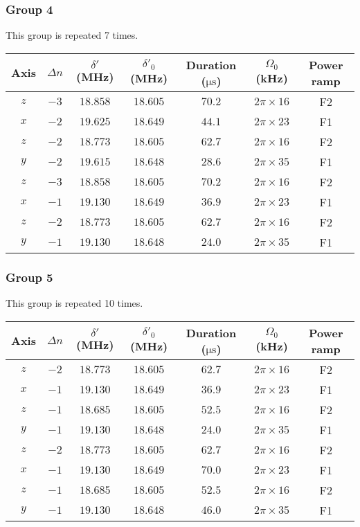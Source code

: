 \newpage
\subsubsection{Group 4}
This group is repeated 7 times.
\begin{center}
  \begin{tabular}{|c|c|c|c|c|c|c|}
    \hline
    Axis&$\Delta n$&$\delta'$ (MHz)&$\delta'_0$ (MHz)&Duration ($\mathrm{\mu s}$)& $\Omega_0$ (kHz)&Power ramp\\\hline
    $z$&$-3$&$18.858$&$18.605$&$70.2$&$2\pi\times16$&F2\\\hline
    $x$&$-2$&$19.625$&$18.649$&$44.1$&$2\pi\times23$&F1\\\hline
    $z$&$-2$&$18.773$&$18.605$&$62.7$&$2\pi\times16$&F2\\\hline
    $y$&$-2$&$19.615$&$18.648$&$28.6$&$2\pi\times35$&F1\\\hline
    $z$&$-3$&$18.858$&$18.605$&$70.2$&$2\pi\times16$&F2\\\hline
    $x$&$-1$&$19.130$&$18.649$&$36.9$&$2\pi\times23$&F1\\\hline
    $z$&$-2$&$18.773$&$18.605$&$62.7$&$2\pi\times16$&F2\\\hline
    $y$&$-1$&$19.130$&$18.648$&$24.0$&$2\pi\times35$&F1\\\hline
  \end{tabular}
\end{center}

\newpage
\subsubsection{Group 5}
This group is repeated 10 times.
\begin{center}
  \begin{tabular}{|c|c|c|c|c|c|c|}
    \hline
    Axis&$\Delta n$&$\delta'$ (MHz)&$\delta'_0$ (MHz)&Duration ($\mathrm{\mu s}$)& $\Omega_0$ (kHz)&Power ramp\\\hline
    $z$&$-2$&$18.773$&$18.605$&$62.7$&$2\pi\times16$&F2\\\hline
    $x$&$-1$&$19.130$&$18.649$&$36.9$&$2\pi\times23$&F1\\\hline
    $z$&$-1$&$18.685$&$18.605$&$52.5$&$2\pi\times16$&F2\\\hline
    $y$&$-1$&$19.130$&$18.648$&$24.0$&$2\pi\times35$&F1\\\hline
    $z$&$-2$&$18.773$&$18.605$&$62.7$&$2\pi\times16$&F2\\\hline
    $x$&$-1$&$19.130$&$18.649$&$70.0$&$2\pi\times23$&F1\\\hline
    $z$&$-1$&$18.685$&$18.605$&$52.5$&$2\pi\times16$&F2\\\hline
    $y$&$-1$&$19.130$&$18.648$&$46.0$&$2\pi\times35$&F1\\\hline
  \end{tabular}
\end{center}


